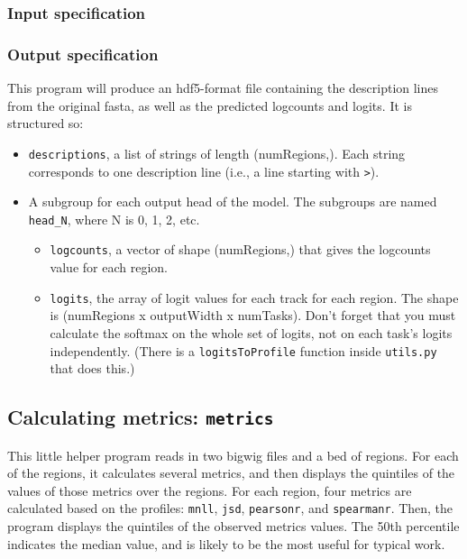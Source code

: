 \documentclass{article}
\begin{document}
\subsubsection{Input specification}



\subsubsection{Output specification}

This program will produce an hdf5-format file containing the description lines from the original
fasta, as well as the predicted logcounts and logits.
It is structured so:

\begin{itemize}
    \item \texttt{descriptions}, a list of strings of length (numRegions,). Each string
        corresponds to one description line (i.e., a line starting with \texttt{>}).
    \item A subgroup for each output head of the model. The subgroups are named \texttt{head\_N},
        where N is 0, 1, 2, etc.
        \begin{itemize}
            \item \texttt{logcounts}, a vector of shape (numRegions,) that gives the logcounts
                value for each region.
            \item \texttt{logits}, the array of logit values for each track for each region.
                The shape is (numRegions x outputWidth x numTasks). Don't forget that you must
                calculate the softmax on the whole set of logits, not on each task's logits
                independently.
                (There is a \texttt{logitsToProfile} function inside \texttt{utils.py} that
                does this.)
        \end{itemize}
\end{itemize}

\newpage

\subsection{Calculating metrics: \texttt{metrics}}\label{prog:metrics}

This little helper program reads in two bigwig files and a bed of regions.
For each of the regions, it calculates several metrics, and then displays
the quintiles of the values of those metrics over the regions.
For each region, four metrics are calculated based on the profiles: \texttt{mnll},
\texttt{jsd}, \texttt{pearsonr}, and \texttt{spearmanr}.
Then, the program displays the quintiles of the observed metrics values. The
50th percentile indicates the median value, and is likely to be the most useful
for typical work.
\end{document}
